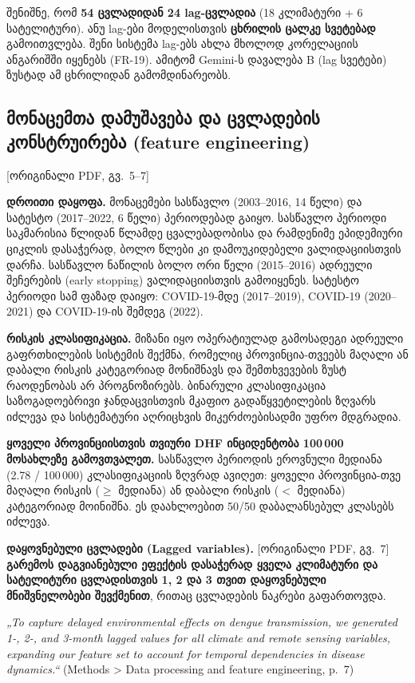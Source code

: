 \documentclass[11pt,a4paper]{article}
\newcommand{\imp}[1]{\textbf{\color{importred}#1}}
\newcommand{\pg}[1]{{\small\color{gray}[ორიგინალი PDF, გვ.~#1]}}
\begin{document}
\begin{etl}
შენიშნე, რომ \imp{54 ცვლადიდან 24 lag-ცვლადია} (18 კლიმატური + 6 სატელიტური). ანუ lag-ები მოდელისთვის
\textbf{ცხრილის ცალკე სვეტებად} გამოითვლება. შენი სისტემა lag-ებს ახლა მხოლოდ კორელაციის ანგარიშში
იყენებს (FR-19). ამიტომ Gemini-ს დავალება B (lag სვეტები) ზუსტად ამ ცხრილიდან გამომდინარეობს.
\end{etl}

\subsection*{მონაცემთა დამუშავება და ცვლადების კონსტრუირება (feature engineering)} \pg{5--7}

\textbf{დროითი დაყოფა.} მონაცემები სასწავლო (2003--2016, 14 წელი) და სატესტო (2017--2022, 6 წელი) პერიოდებად
გაიყო. სასწავლო პერიოდი საკმარისია წლიდან წლამდე ცვალებადობისა და რამდენიმე ეპიდემიური ციკლის
დასაჭერად, ბოლო წლები კი დამოუკიდებელი ვალიდაციისთვის დარჩა. სასწავლო ნაწილის ბოლო ორი წელი
(2015--2016) ადრეული შეჩერების (early stopping) ვალიდაციისთვის გამოიყენეს. სატესტო პერიოდი სამ ფაზად დაიყო:
COVID-19-მდე (2017--2019), COVID-19 (2020--2021) და COVID-19-ის შემდეგ (2022).

\textbf{რისკის კლასიფიკაცია.} მიზანი იყო ოპერატიულად გამოსადეგი ადრეული გაფრთხილების სისტემის შექმნა,
რომელიც პროვინცია-თვეებს მაღალი ან დაბალი რისკის კატეგორიად მონიშნავს და შემთხვევების ზუსტ რაოდენობას
არ პროგნოზირებს. ბინარული კლასიფიკაცია საზოგადოებრივი ჯანდაცვისთვის მკაფიო გადაწყვეტილების ზღვარს იძლევა
და სისტემატური აღრიცხვის მიკერძოებისადმი უფრო მდგრადია.

\imp{ყოველი პროვინციისთვის თვიური DHF ინციდენტობა 100\,000 მოსახლეზე გამოვთვალეთ.} სასწავლო პერიოდის
ეროვნული მედიანა (2.78 / 100\,000) კლასიფიკაციის ზღვრად ავიღეთ: ყოველი პროვინცია-თვე მაღალი რისკის
($\geq$ მედიანა) ან დაბალი რისკის ($<$ მედიანა) კატეგორიად მოინიშნა. ეს დაახლოებით 50/50 დაბალანსებულ
კლასებს იძლევა.

\textbf{დაყოვნებული ცვლადები (Lagged variables).} \pg{7}
\imp{გარემოს დაგვიანებული ეფექტის დასაჭერად ყველა კლიმატური და სატელიტური ცვლადისთვის 1, 2 და 3 თვით
დაყოვნებული მნიშვნელობები შევქმენით}, რითაც ცვლადების ნაკრები გაფართოვდა.

\begin{citat}
\textit{„To capture delayed environmental effects on dengue transmission, we generated 1-, 2-, and 3-month lagged values for all climate and remote sensing variables, expanding our feature set to account for temporal dependencies in disease dynamics.“} (Methods > Data processing and feature engineering, p.~7)
\end{citat}
\end{document}
